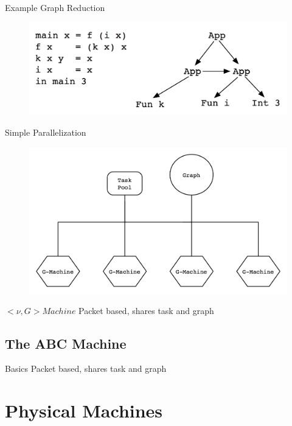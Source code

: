 \documentclass{beamer}
\begin{document}
\begin{frame}{Example Graph Reduction}
    \begin{figure}
    \centering
        \includegraphics[scale=.3]{figures/GraphRed1.png}
    \end{figure}
\end{frame}

\begin{frame}{Simple Parallelization}
    \begin{figure}
    \centering
        \includegraphics[scale=.3]{figures/simpleParallel.png}
    \end{figure}
\end{frame}

\begin{frame}{$<\nu, G> Machine$}
Packet based, shares task and graph
\end{frame}


\subsection[The ABC Machines]{The ABC Machine}
\begin{frame}{Basics}
Packet based, shares task and graph
\end{frame}

\section{Physical Machines}
\end{document}
